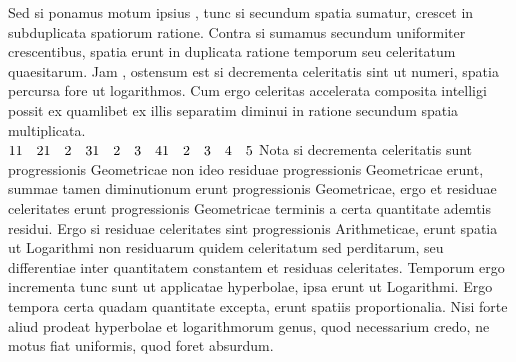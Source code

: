 \pend
\pstart
Sed si ponamus motum ipsius ,
tunc si secundum spatia sumatur, crescet in subduplicata spatiorum ratione. Contra si sumamus secundum 
uniformiter crescentibus, spatia erunt in duplicata ratione temporum seu celeritatum quaesitarum. Jam ,
ostensum est si decrementa celeritatis sint ut numeri, spatia percursa fore ut logarithmos. Cum ergo celeritas accelerata composita intelligi possit ex 
quamlibet ex illis separatim diminui in ratione secundum spatia multiplicata.\\
$\displaystyle 1\\
1 \quad 2\\
1 \quad 2 \quad 3\\
1 \quad 2 \quad 3 \quad 4\\
1 \quad 2 \quad 3 \quad 4 \quad 5$
\pend
\pstart
Nota si decrementa celeritatis sunt progressionis Geometricae non ideo residuae progressionis Geometricae erunt, summae tamen diminutionum erunt progressionis Geometricae, ergo et residuae celeritates erunt progressionis Geometricae terminis a certa quantitate ademtis residui. Ergo si residuae celeritates sint progressionis Arithmeticae, erunt spatia ut Logarithmi non residuarum quidem celeritatum sed perditarum, seu differentiae inter quantitatem constantem et residuas celeritates. Temporum ergo incrementa tunc sunt ut applicatae hyperbolae, 
ipsa erunt ut Logarithmi. Ergo tempora certa quadam quantitate excepta, erunt spatiis proportionalia. Nisi forte aliud prodeat hyperbolae et logarithmorum genus, quod necessarium credo, ne motus fiat uniformis, quod foret absurdum.\\
